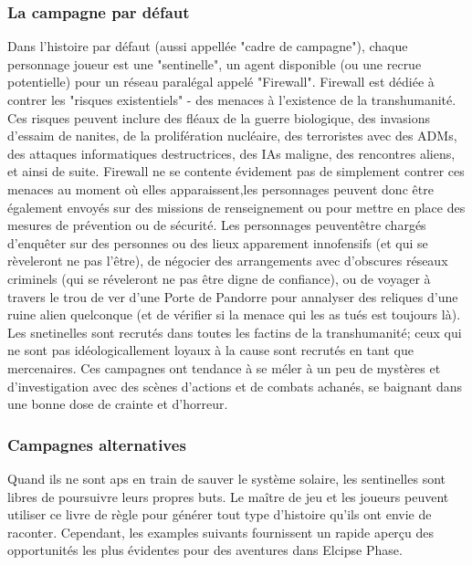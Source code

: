 \subsubsection{La campagne par défaut} \label{sec:default-campaign} 

Dans l'histoire par défaut (aussi appellée "cadre de campagne"), chaque personnage joueur est une "sentinelle", un agent disponible (ou une recrue potentielle) pour un réseau paralégal appelé "Firewall". Firewall est dédiée à contrer les "risques existentiels" - des menaces à l'existence de la transhumanité. Ces risques peuvent inclure des fléaux de la guerre biologique, des invasions d'essaim de nanites, de la prolifération nucléaire, des terroristes avec des ADMs, des attaques informatiques destructrices, des IAs maligne, des rencontres aliens, et ainsi de suite. Firewall ne se contente évidement pas de simplement contrer ces menaces au moment où elles apparaissent,les personnages peuvent donc être également envoyés sur des missions de renseignement ou pour mettre en place des mesures de prévention ou de sécurité. Les personnages peuventêtre chargés d'enquêter sur des personnes ou des lieux apparement innofensifs (et qui se rèveleront ne pas l'être), de négocier des arrangements avec d'obscures réseaux criminels (qui se réveleront ne pas être digne de confiance), ou de voyager à travers le trou de ver d'une Porte de Pandorre pour annalyser des reliques d'une ruine alien quelconque (et de vérifier si la menace qui les as tués est toujours là). Les snetinelles sont recrutés dans toutes les factins de la transhumanité; ceux qui ne sont pas idéologicallement loyaux à la cause sont recrutés en tant que mercenaires. Ces campagnes ont tendance à se méler à un peu de mystères et d'investigation avec des scènes d'actions et de combats achanés, se baignant dans une bonne dose de crainte et d'horreur. 



\subsubsection{Campagnes alternatives} \label{sec:alternate-campaigns} 

Quand ils ne sont aps en train de sauver le système solaire, les sentinelles sont libres de poursuivre leurs propres buts. Le maître de jeu et les joueurs peuvent utiliser ce livre de règle pour générer tout type d'histoire qu'ils ont envie de raconter. Cependant, les examples suivants fournissent un rapide aperçu des opportunités les plus évidentes pour des aventures dans Elcipse Phase. 

